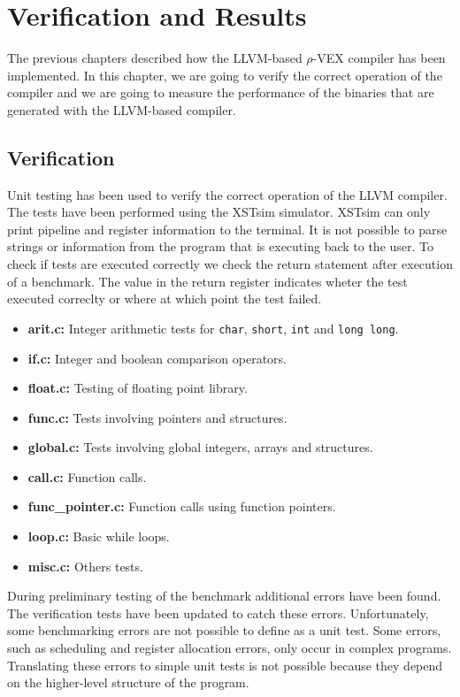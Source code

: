 \chapter{Verification and Results}
\label{chap:results}
The previous chapters described how the LLVM-based $\rho$-VEX compiler has been implemented. In this chapter, we are going to verify the correct operation of the compiler and we are going to measure the performance of the binaries that are generated with the LLVM-based compiler. 

\section{Verification}
Unit testing has been used to verify the correct operation of the LLVM compiler. The tests have been performed using the XSTsim simulator. XSTsim can only print pipeline and register information to the terminal. It is not possible to parse strings or information from the program that is executing back to the user. To check if tests are executed correctly we check the return statement after execution of a benchmark. The value in the return register indicates wheter the test executed correclty or where at which point the test failed.

\begin{itemize}
	\item \textbf{arit.c:} Integer arithmetic tests for \texttt{char}, \texttt{short}, \texttt{int} and \texttt{long long}.
	\item \textbf{if.c:} Integer and boolean comparison operators.
	\item \textbf{float.c:} Testing of floating point library.
	\item \textbf{func.c:} Tests involving pointers and structures.
	\item \textbf{global.c:}  Tests involving global integers, arrays and structures.
	\item \textbf{call.c:} Function calls.
	\item \textbf{func\_pointer.c:} Function calls using function pointers.
	\item \textbf{loop.c:} Basic while loops.
	\item \textbf{misc.c:} Others tests.
\end{itemize}

During preliminary testing of the benchmark additional errors have been found. The verification tests have been updated to catch these errors. Unfortunately, some benchmarking errors are not possible to define as a unit test. Some errors, such as scheduling and register allocation errors, only occur in complex programs. Translating these errors to simple unit tests is not possible because they depend on the higher-level structure of the program.


